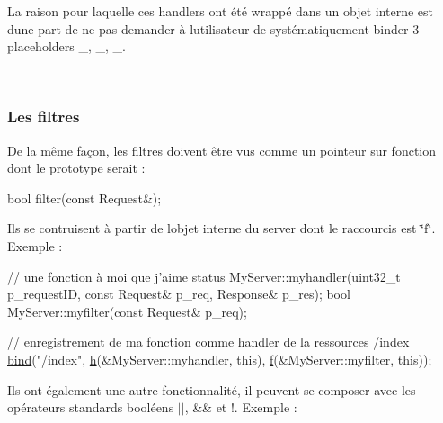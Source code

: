 La raison pour laquelle ces handlers ont été wrappé dans un objet interne est d\textquotesingle{}une part de ne pas demander à l\textquotesingle{}utilisateur de systématiquement binder 3 placeholders \+\_, \+\_, \+\_.

~\newline
 \subsubsection*{Les filtres }

De la même façon, les filtres doivent être vus comme un pointeur sur fonction dont le prototype serait \+: 
\begin{DoxyCode}
\textcolor{keywordtype}{bool} filter(\textcolor{keyword}{const} Request&);
\end{DoxyCode}


Ils se contruisent à partir de l\textquotesingle{}objet interne du server dont le raccourcis est \char`\"{}f\char`\"{}. Exemple \+: 
\begin{DoxyCode}
\textcolor{comment}{// une fonction à moi que j'aime}
status MyServer::myhandler(uint32\_t p\_requestID, \textcolor{keyword}{const} Request& p\_req, Response& p\_res);
\textcolor{keywordtype}{bool}  MyServer::myfilter(\textcolor{keyword}{const} Request& p\_req);

\textcolor{comment}{// enregistrement de ma fonction comme handler de la ressources /index}
\hyperlink{classxtd_1_1network_1_1http_1_1Server_aa964ab0b0c3ba29238cb2aae49181537}{bind}(\textcolor{stringliteral}{"/index"}, \hyperlink{classxtd_1_1network_1_1http_1_1Server_af55090adba952bd4ddcd6eb467974ac8}{h}(&MyServer::myhandler, \textcolor{keyword}{this}), \hyperlink{classxtd_1_1network_1_1http_1_1Server_a94d4867ec740265b62b7505584387240}{f}(&MyServer::myfilter, \textcolor{keyword}{this}));
\end{DoxyCode}


Ils ont également une autre fonctionnalité, il peuvent se composer avec les opérateurs standards booléens $\vert$$\vert$, \&\& et !. Exemple \+:


